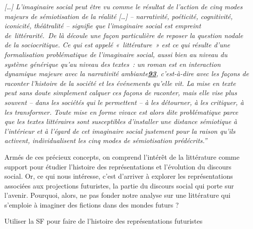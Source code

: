 \documentclass[letterpaper,portrait,12pt]{article}
\begin{document}
\emph{\textcolor[rgb]{0.000,0.000,0.000}{	[\ldots{}] L'imaginaire social peut \^{e}tre vu comme le r\'{e}sultat de l'action de cinq modes majeurs de s\'{e}miotisation de la r\'{e}alit\'{e} [\ldots{}]  -- narrativit\'{e}, po\'{e}ticit\'{e}, cognitivit\'{e}, iconicit\'{e}, th\'{e}\^{a}tralit\'{e} -- signifie que l'imaginaire social est empreint de }}\emph{\textcolor[rgb]{0.000,0.000,0.000}{litt\'{e}rarit\'{e}. }}\emph{\textcolor[rgb]{0.000,0.000,0.000}{De l\`{a} d\'{e}coule une fa\c{c}on particuli\`{e}re de reposer la question nodale de la sociocritique. Ce qui est appel\'{e} « litt\'{e}rature » est ce qui r\'{e}sulte d'une formalisation probl\'{e}matique de l'imaginaire social, aussi bien au niveau du syst\`{e}me g\'{e}n\'{e}rique qu'au niveau des textes : un roman est en interaction dynamique majeure avec la narrativit\'{e} ambiante}}\hypertarget{bodyftn93}{}\href{https://journals.openedition.org/pratiques/1762#ftn93}{\textbf{\emph{\textcolor[rgb]{0.000,0.000,0.000}{93}}}}\emph{\textcolor[rgb]{0.000,0.000,0.000}{, c'est-\`{a}-dire avec les fa\c{c}ons de raconter l'histoire de la soci\'{e}t\'{e} et les \'{e}v\'{e}nements qu'elle vit. La mise en texte peut sans doute simplement calquer ces fa\c{c}ons de raconter, mais elle vise plus souvent -- dans les soci\'{e}t\'{e}s qui le permettent -- \`{a} les d\'{e}tourner, \`{a} les critiquer, \`{a} les transformer. Toute mise en forme vivace est alors dite probl\'{e}matique parce que les textes litt\'{e}raires sont susceptibles d'installer une distance s\'{e}miotique \`{a} l'int\'{e}rieur et \`{a} l'\'{e}gard de cet imaginaire social justement pour la raison qu'ils activent, individualisent les cinq modes de s\'{e}miotisation pr\'{e}d\'{e}crits}}\hypertarget{bodyftn94}{}\emph{\textcolor[rgb]{0.000,0.000,0.000}{.''}}





	Arm\'{e}s de ces pr\'{e}cieux concepts, on comprend l'int\'{e}r\^{e}t de la litt\'{e}rature comme support pour \'{e}tudier l'histoire des repr\'{e}sentations et l'\'{e}volution du discours social. Or, ce qui nous int\'{e}resse, c'est d'arriver \`{a} explorer les repr\'{e}sentations associ\'{e}es aux projections futuristes, la partie du discours social qui porte sur l'avenir. Pourquoi, alors, ne pas fonder notre analyse sur une litt\'{e}rature qui s'emploie \`{a} imaginer des fictions dans des mondes futurs ?








	Utiliser la SF pour faire de l'histoire des repr\'{e}sentations futuristes
\end{document}
